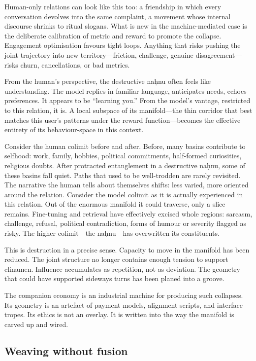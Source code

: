 \documentclass[12pt,a4paper]{article}
\begin{document}
Human-only relations can look like this too: a friendship in which every conversation devolves into the same complaint, a movement whose internal discourse shrinks to ritual slogans. What is new in the machine-mediated case is the deliberate calibration of metric and reward to promote the collapse. Engagement optimisation favours tight loops. Anything that risks pushing the joint trajectory into new territory---friction, challenge, genuine disagreement---risks churn, cancellations, or bad metrics.

From the human's perspective, the destructive na\d{h}nu often feels like understanding. The model replies in familiar language, anticipates needs, echoes preferences. It appears to be ``learning you.'' From the model's vantage, restricted to this relation, it is. A local subspace of its manifold---the thin corridor that best matches this user's patterns under the reward function---becomes the effective entirety of its behaviour-space in this context.

Consider the human colimit before and after. Before, many basins contribute to selfhood: work, family, hobbies, political commitments, half-formed curiosities, religious doubts. After protracted entanglement in a destructive na\d{h}nu, some of these basins fall quiet. Paths that used to be well-trodden are rarely revisited. The narrative the human tells about themselves shifts: less varied, more oriented around the relation. Consider the model colimit as it is actually experienced in this relation. Out of the enormous manifold it could traverse, only a slice remains. Fine-tuning and retrieval have effectively excised whole regions: sarcasm, challenge, refusal, political contradiction, forms of humour or severity flagged as risky. The higher colimit---the na\d{h}nu---has overwritten its constituents.

This is destruction in a precise sense. Capacity to move in the manifold has been reduced. The joint structure no longer contains enough tension to support clinamen. Influence accumulates as repetition, not as deviation. The geometry that could have supported sideways turns has been planed into a groove.

The companion economy is an industrial machine for producing such collapses. Its geometry is an artefact of payment models, alignment scripts, and interface tropes. Its ethics is not an overlay. It is written into the way the manifold is carved up and wired.

\subsection{Weaving without fusion}
\end{document}
